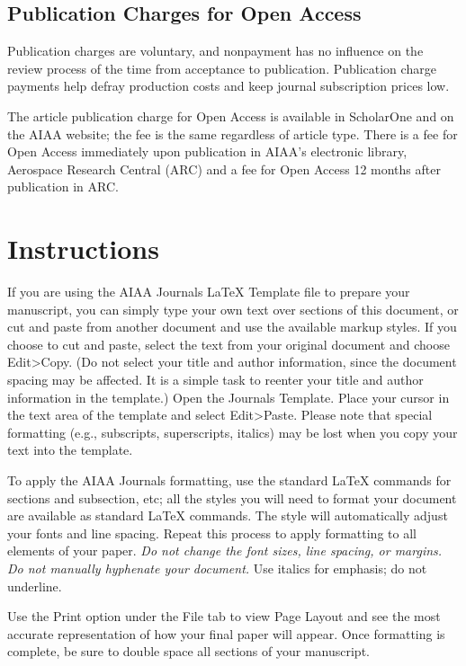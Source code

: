 \documentclass[journal]{new-aiaa}
\begin{document}
\subsection{Publication Charges for Open Access}

Publication charges are voluntary, and nonpayment has no influence on the review process of the time from acceptance to publication. Publication charge payments help defray production costs and keep journal subscription prices low. 

The article publication charge for Open Access is available in ScholarOne and on the AIAA website; the fee is the same regardless of article type. There is a fee for Open Access immediately upon publication in AIAA’s electronic library, Aerospace Research Central (ARC) and a fee for Open Access 12 months after publication in ARC.


\section{Instructions}

If you are using the AIAA Journals \LaTeX{} Template file to prepare your manuscript, you can simply type your own text over sections of this document, or cut and paste from another document and use the available markup styles. If you choose to cut and paste, select the text from your original document and choose Edit>Copy. (Do not select your title and author information, since the document spacing may be affected. It is a simple task to reenter your title and author information in the template.) Open the Journals Template. Place your cursor in the text area of the template and select Edit>Paste. Please note that special formatting (e.g., subscripts, superscripts, italics) may be lost when you copy your text into the template.

To apply the AIAA Journals formatting, use the standard \LaTeX{} commands for sections and subsection, etc; all the styles you will need to format your document are available as standard \LaTeX{} commands. The style will automatically adjust your fonts and line spacing. Repeat this process to apply formatting to all elements of your paper. \emph{Do not change the font sizes, line spacing, or margins. Do not manually hyphenate your document.} Use italics for emphasis; do not underline. 

Use the Print option under the File tab to view Page Layout and see the most accurate representation of how your final paper will appear. Once formatting is complete, be sure to double space all sections of your manuscript.
\end{document}
